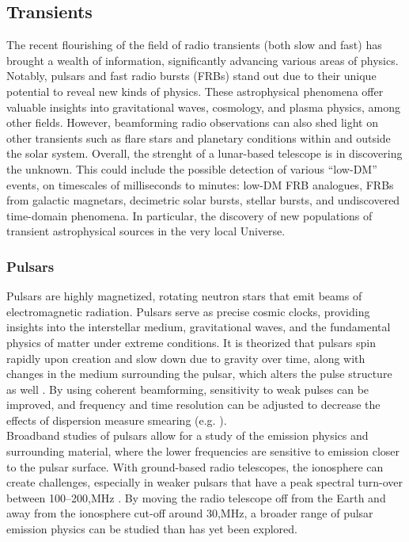 \subsection{Transients}
The recent flourishing of the field of radio transients (both slow and fast) has brought a wealth of information, significantly advancing various areas of physics. Notably, pulsars and fast radio bursts (FRBs) stand out due to their unique potential to reveal new kinds of physics. These astrophysical phenomena offer valuable insights into gravitational waves, cosmology, and plasma physics, among other fields. However, beamforming radio observations can also shed light on other transients such as flare stars and planetary conditions within and outside the solar system. Overall, the strenght of a lunar-based telescope is in discovering the unknown. This could include the possible detection of various “low-DM” events, on timescales of milliseconds to minutes: low-DM FRB analogues, FRBs from galactic magnetars, decimetric solar bursts, stellar bursts, and undiscovered time-domain phenomena. In particular, the discovery of new populations of transient astrophysical sources in the very local Universe.

\subsubsection{Pulsars}
Pulsars are highly magnetized, rotating neutron stars that emit beams of electromagnetic radiation. Pulsars serve as precise cosmic clocks, providing insights into the interstellar medium, gravitational waves, and the fundamental physics of matter under extreme conditions. It is theorized that pulsars spin rapidly upon creation and slow down due to gravity over time, along with changes in the medium surrounding the pulsar, which alters the pulse structure as well \citep{LW_2013}. By using coherent beamforming, sensitivity to weak pulses can be improved, and frequency and time resolution can be adjusted to decrease the effects of dispersion measure smearing (e.g. \cite{WL_2020}).\\

Broadband studies of pulsars allow for a study of the emission physics and surrounding material, where the lower frequencies are sensitive to emission closer to the pulsar surface. With ground-based radio telescopes, the ionosphere can create challenges, especially in weaker pulsars that have a peak spectral turn-over between 100--200,MHz \citep{Stappers_2011}. By moving the radio telescope off from the Earth and away from the ionosphere cut-off around 30,MHz, a broader range of pulsar emission physics can be studied than has yet been explored.\\

